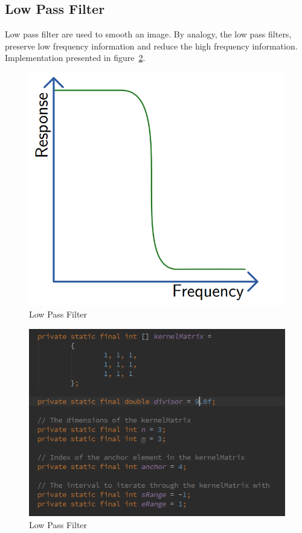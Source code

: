 \documentclass{article}
\begin{document}
\subsection{Low Pass Filter}

Low pass filter are used to smooth an image. By analogy, the low pass filters, preserve low frequency information and reduce the high frequency information.
Implementation presented in figure~\ref{fig:alg_low_pass}.

\begin{figure}[H]
\centering

  \includegraphics[width=0.5\linewidth]{res/low_pass_graph.png}
  
\caption{Low Pass Filter}
\label{fig:low_pass_graph}
\end{figure}


\begin{figure}[H]
\centering

  \includegraphics[width=0.9\linewidth]{res/algorithms/low_pass.png}
  
\caption{Low Pass Filter}
\label{fig:alg_low_pass}
\end{figure}
\end{document}
